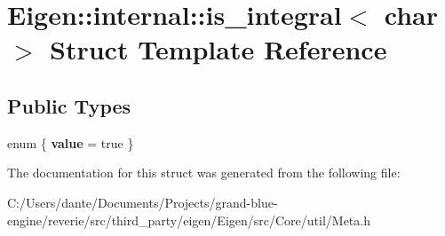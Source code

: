 \hypertarget{struct_eigen_1_1internal_1_1is__integral_3_01char_01_4}{}\section{Eigen\+::internal\+::is\+\_\+integral$<$ char $>$ Struct Template Reference}
\label{struct_eigen_1_1internal_1_1is__integral_3_01char_01_4}
\subsection*{Public Types}
\begin{DoxyCompactItemize}
\item 
\mbox{\label{struct_eigen_1_1internal_1_1is__integral_3_01char_01_4_a309013563c33ba0f756fa163c4737794}} 
enum \{ {\bfseries value} = true
 \}
\end{DoxyCompactItemize}


The documentation for this struct was generated from the following file\+:\begin{DoxyCompactItemize}
\item 
C\+:/\+Users/dante/\+Documents/\+Projects/grand-\/blue-\/engine/reverie/src/third\+\_\+party/eigen/\+Eigen/src/\+Core/util/Meta.\+h\end{DoxyCompactItemize}
